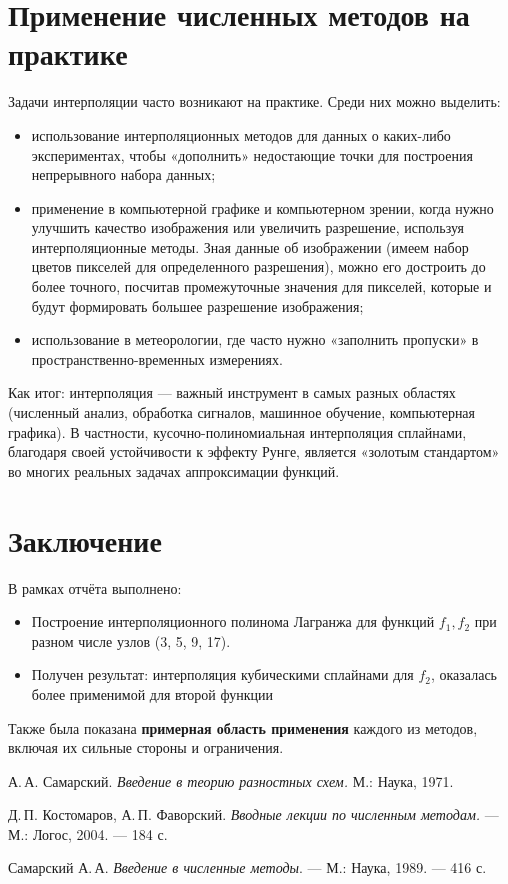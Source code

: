 \documentclass[a4paper, fleqn]{report}
\begin{document}
\chapter{Применение численных методов на практике}
Задачи интерполяции часто возникают на практике. Среди них можно выделить:
\begin{itemize}
    \item использование интерполяционных методов для данных о каких-либо экспериментах, чтобы «дополнить» недостающие точки для построения непрерывного набора данных;
    \item применение в компьютерной графике и компьютерном зрении, когда нужно улучшить качество изображения или увеличить разрешение, используя интерполяционные методы. Зная данные об изображении (имеем набор цветов пикселей для определенного разрешения), можно его достроить до более точного, посчитав промежуточные значения для пикселей, которые и будут формировать большее разрешение изображения;
    \item использование в метеорологии, где часто нужно «заполнить пропуски» в пространственно-временных измерениях.
\end{itemize}

\noindent Как итог: интерполяция --- важный инструмент в самых разных областях (численный анализ, обработка сигналов, машинное обучение, компьютерная графика). В частности, кусочно-полиномиальная интерполяция сплайнами, благодаря своей устойчивости к эффекту Рунге, является «золотым стандартом» во многих реальных задачах аппроксимации функций.

\bigskip

\chapter*{Заключение}

В рамках отчёта выполнено:
\begin{itemize}
    \item Построение интерполяционного полинома Лагранжа для функций \(f_1, f_2\) при разном числе узлов (3, 5, 9, 17).
    \item Получен результат: интерполяция кубическими сплайнами для \(f_2\), оказалась более применимой для второй функции

\end{itemize}

\vspace{10pt}

\noindent Также была показана \textbf{примерная область применения} каждого из методов, включая их сильные стороны и ограничения.

\begin{thebibliography}{9}
\renewcommand{\bibname}{Литература}
А.\,А. Самарский. \textit{Введение в теорию разностных схем.} М.: Наука, 1971.

Д.\,П. Костомаров, А.\,П. Фаворский. \textit{Вводные лекции по численным методам.} — М.: Логос, 2004. — 184 с.

Самарский А.\,А. \textit{Введение в численные методы}. — М.: Наука, 1989. — 416 с.

\end{thebibliography}
\end{document}
